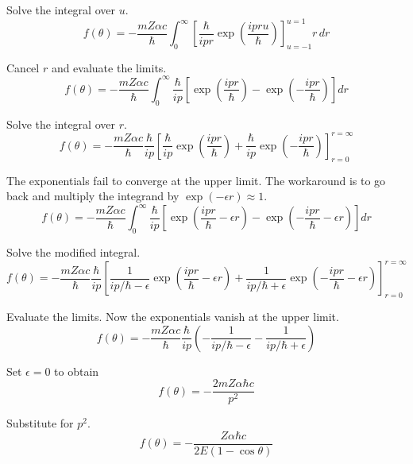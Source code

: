 Solve the integral over $u$.
\begin{equation*}
f(\theta)=-\frac{mZ\alpha c}{\hbar}
\int_0^\infty
\left[\frac{\hbar}{ipr}\exp\left(\frac{ipru}{\hbar}\right)\right]_{u=-1}^{u=1}
r\,dr
\end{equation*}

Cancel $r$ and evaluate the limits.
\begin{equation*}
f(\theta)=-\frac{mZ\alpha c}{\hbar}
\int_0^\infty
\frac{\hbar}{ip}
\left[\exp\left(\frac{ipr}{\hbar}\right)-\exp\left(-\frac{ipr}{\hbar}\right)\right]
dr
\end{equation*}

Solve the integral over $r$.
\begin{equation*}
f(\theta)
=-\frac{mZ\alpha c}{\hbar}\frac{\hbar}{ip}
\left[
\frac{\hbar}{ip}
\exp\left(\frac{ipr}{\hbar}\right)
+\frac{\hbar}{ip}
\exp\left(-\frac{ipr}{\hbar}\right)
\right]_{r=0}^{r=\infty}
\end{equation*}

The exponentials fail to converge at the upper limit.
The workaround is to go back and multiply the integrand by $\exp(-\epsilon r)\approx1$.
\begin{equation*}
f(\theta)=-\frac{mZ\alpha c}{\hbar}
\int_0^\infty
\frac{\hbar}{ip}
\left[\exp\left(\frac{ipr}{\hbar}-\epsilon r\right)
-\exp\left(-\frac{ipr}{\hbar}-\epsilon r\right)\right]
dr
\end{equation*}

Solve the modified integral.
\begin{equation*}
f(\theta)=-\frac{mZ\alpha c}{\hbar}
\frac{\hbar}{ip}
\left[
\frac{1}{ip/\hbar-\epsilon}\exp\left(\frac{ipr}{\hbar}-\epsilon r\right)
+\frac{1}{ip/\hbar+\epsilon}\exp\left(-\frac{ipr}{\hbar}-\epsilon r\right)
\right]_{r=0}^{r=\infty}
\end{equation*}

Evaluate the limits. Now the exponentials vanish at the upper limit.
\begin{equation*}
f(\theta)=-\frac{mZ\alpha c}{\hbar}
\frac{\hbar}{ip}
\left(-\frac{1}{ip/\hbar-\epsilon}-\frac{1}{ip/\hbar+\epsilon}\right)
\tag{1}
\end{equation*}

Set $\epsilon=0$ to obtain
\begin{equation*}
f(\theta)=-\frac{2mZ\alpha\hbar c}{p^2}
\end{equation*}

Substitute for $p^2$.
\begin{equation*}
f(\theta)=-\frac{Z\alpha\hbar c}{2E(1-\cos\theta)}
\end{equation*}

